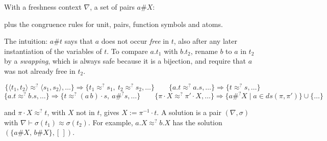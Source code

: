 \begin{definition}\label{def:lkanren-fresh}
With a freshness context $\nabla$, a set of pairs $a\#X$:
plus the congruence rules for unit, pairs, function symbols and atoms.
\end{definition}

The intuition: $a\#t$ says that $a$ does not occur \emph{free} in $t$, also after any later
instantiation of the variables of $t$. To compare $a.t_1$ with $b.t_2$, rename $b$ to $a$ in $t_2$ by
a \emph{swapping}, which is always safe because it is a bijection, and require that $a$ was not
already free in $t_2$.

\begin{definition}
\begin{fullwidth}
\[
  \{\langle t_1,t_2\rangle\approx^?\langle s_1,s_2\rangle,\dots\}\Rightarrow\{t_1\approx^?s_1,\ t_2\approx^?s_2,\dots\}\qquad
  \{a.t\approx^?a.s,\dots\}\Rightarrow\{t\approx^?s,\dots\}
\]
\[
  \{a.t\approx^?b.s,\dots\}\Rightarrow\{t\approx^?(a\,b)\cdot s,\ a\#^?s,\dots\}\qquad
  \{\pi\cdot X\approx^?\pi'\cdot X,\dots\}\Rightarrow\{a\#^?X\mid a\in ds(\pi,\pi')\}\cup\{\dots\}
\]
\end{fullwidth}
and $\pi\cdot X\approx^?t$, with $X$ not in $t$, gives $X:=\pi^{-1}\cdot t$. A solution is a pair
$(\nabla,\sigma)$ with $\nabla\vdash\sigma(t_1)\approx\sigma(t_2)$. For example, $a.X\approx^?b.X$ has
the solution $(\{a\#X,\,b\#X\},[\,])$.
\end{definition}

